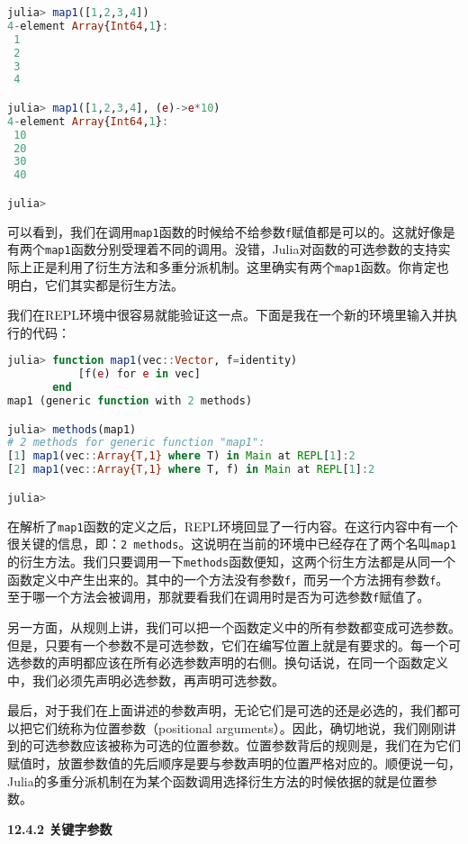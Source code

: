 \begin{lstlisting}[language=julia]
julia> map1([1,2,3,4])
4-element Array{Int64,1}:
 1
 2
 3
 4

julia> map1([1,2,3,4], (e)->e*10)
4-element Array{Int64,1}:
 10
 20
 30
 40

julia> 
\end{lstlisting}

可以看到，我们在调用\verb|map1|函数的时候给不给参数\verb|f|赋值都是可以的。这就好像是有两个\verb|map1|函数分别受理着不同的调用。没错，Julia对函数的可选参数的支持实际上正是利用了衍生方法和多重分派机制。这里确实有两个\verb|map1|函数。你肯定也明白，它们其实都是衍生方法。

我们在REPL环境中很容易就能验证这一点。下面是我在一个新的环境里输入并执行的代码：

\begin{lstlisting}[language=julia]
julia> function map1(vec::Vector, f=identity)
           [f(e) for e in vec]
       end
map1 (generic function with 2 methods)

julia> methods(map1)
# 2 methods for generic function "map1":
[1] map1(vec::Array{T,1} where T) in Main at REPL[1]:2
[2] map1(vec::Array{T,1} where T, f) in Main at REPL[1]:2

julia> 
\end{lstlisting}

在解析了\verb|map1|函数的定义之后，REPL环境回显了一行内容。在这行内容中有一个很关键的信息，即：\verb|2 methods|。这说明在当前的环境中已经存在了两个名叫\verb|map1|的衍生方法。我们只要调用一下\verb|methods|函数便知，这两个衍生方法都是从同一个函数定义中产生出来的。其中的一个方法没有参数\verb|f|，而另一个方法拥有参数\verb|f|。至于哪一个方法会被调用，那就要看我们在调用时是否为可选参数\verb|f|赋值了。

另一方面，从规则上讲，我们可以把一个函数定义中的所有参数都变成可选参数。但是，只要有一个参数不是可选参数，它们在编写位置上就是有要求的。每一个可选参数的声明都应该在所有必选参数声明的右侧。换句话说，在同一个函数定义中，我们必须先声明必选参数，再声明可选参数。

最后，对于我们在上面讲述的参数声明，无论它们是可选的还是必选的，我们都可以把它们统称为位置参数（positional arguments）。因此，确切地说，我们刚刚讲到的可选参数应该被称为可选的位置参数。位置参数背后的规则是，我们在为它们赋值时，放置参数值的先后顺序是要与参数声明的位置严格对应的。顺便说一句，Julia的多重分派机制在为某个函数调用选择衍生方法的时候依据的就是位置参数。

\textbf{12.4.2 关键字参数}

